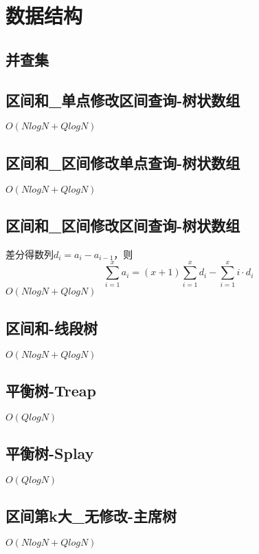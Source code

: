 \documentclass[10pt]{article}
\begin{document}
\section{数据结构}
\subsection{并查集}


\subsection{区间和\_单点修改区间查询-树状数组}
$O(NlogN+QlogN)$


\subsection{区间和\_区间修改单点查询-树状数组}
$O(NlogN+QlogN)$


\subsection{区间和\_区间修改区间查询-树状数组}
差分得数列$d_i=a_i-a_{i-1}$，则
\begin{equation*}
\sum_{i=1}^xa_i=(x+1)\sum_{i=1}^xd_i-\sum_{i=1}^xi\cdot d_i
\end{equation*}
$O(NlogN+QlogN)$


\subsection{区间和-线段树}
$O(NlogN+QlogN)$


\subsection{平衡树-Treap}
$O(QlogN)$


\subsection{平衡树-Splay}
$O(QlogN)$


\subsection{区间第k大\_无修改-主席树}
$O(NlogN+QlogN)$

\end{document}
